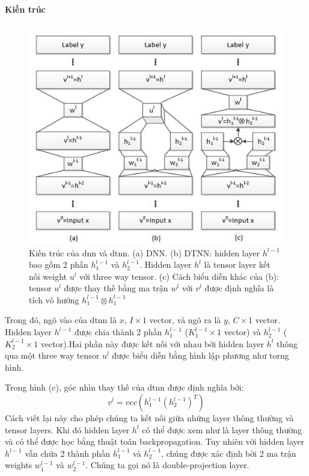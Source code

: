 \paragraph{Kiến trúc}
\begin{figure} [ht]
\centering
\captionsetup{justification=centering}
\includegraphics [scale=1] {Image/DTNN}
\caption{Kiến trúc của \ac{dnn} và \ac{dtnn}. (a) DNN. (b) DTNN: hidden layer $h^{l-1}$ bao gồm 2 phần $h_1^{l-1}$ và $h_2^{l-1}$. Hidden layer $h^l$ là tensor layer kết nối weight $u^l$ với three way tensor. (c) Cách biểu diễn khác của (b): tensor $u^l$ được thay thế bằng ma trận $w^l$ với $v^l$ được định nghĩa là tích vô hướng $h_1^{l-1} \otimes h_1^{l-1}$}
\end{figure}

Trong đó, ngõ vào của \ac{dtnn} là $x$, $I \times 1$ vector, và ngõ ra là $y$, $C \times 1$ vector.
Hidden layer $h^{l-1}$ được chia thành 2 phần $h_1^{l-1}$ ($K_1^{l-1} \times 1$ vector) và  $h_2^{l-1}$ ($K_2^{l-1} \times 1$ vector).Hai phần này được kết nối với nhau bởi hidden layer $h^l$ thông qua một three way tensor $u^l$ được biểu diễn bằng hình lập phương như torng hình.

Trong hình (c), góc nhìn thay thế của \ac{dtnn} được định nghĩa bởi:
\begin{equation}
v^l = vec (h_1^{l-1}(h_2^{l-1})^T)
\end{equation}
Cách viết lại này cho phép chúng ta kết nối giữa những layer thông thường và tensor layers. Khi đó hidden layer $h^l$ có thể được xem như là layer thông thường và có thể được học bằng thuật toán backpropagation. Tuy nhiên với hidden layer $h^{l-1}$ vẫn chứa 2 thành phần $h_1^{l-1}$ và $h_2^{l-1}$, chúng được xác định bời 2 ma trận weights $w_1^{l-1}$ và $w_2^{l-1}$. Chúng ta gọi nó là double-projection layer. 

